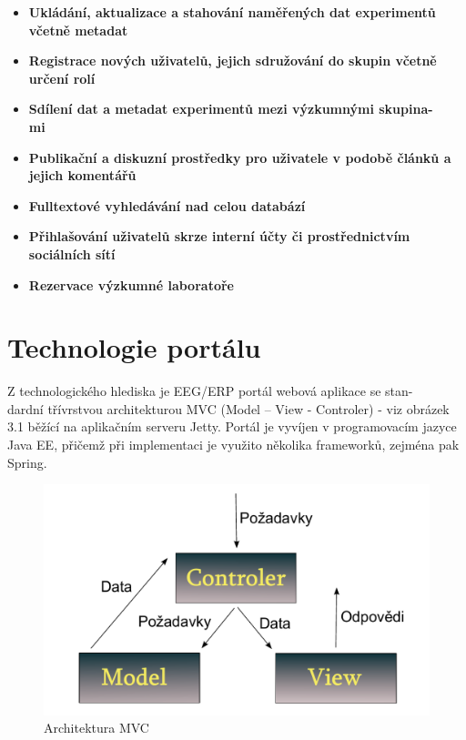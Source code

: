 \documentclass{projekt}
\begin{document}
\begin {itemize}

\item \textbf{Ukládání, aktualizace a stahování naměřených dat experimentů včetně metadat} 

\item \textbf{Registrace nových uživatelů, jejich sdružování do skupin včetně určení rolí} 
\item \textbf{Sdílení dat a metadat experimentů mezi výzkumnými skupina-\\mi}
\item \textbf{Publikační a diskuzní prostředky pro uživatele v podobě článků a jejich komentářů }
\item \textbf{Fulltextové vyhledávání nad celou databází}
\item \textbf{Přihlašování uživatelů skrze interní účty či prostřednictvím sociálních sítí}
\item \textbf{Rezervace výzkumné laboratoře}

\end {itemize}

\section{Technologie portálu}
\hspace{0.65cm}Z technologického hlediska je EEG/ERP portál webová aplikace se stan-\\dardní třívrstvou architekturou MVC (Model – View - Controler) - viz obrázek 3.1 běžící na aplikačním serveru Jetty. Portál je vyvíjen v programovacím jazyce Java EE, přičemž při implementaci je využito několika frameworků, zejména pak Spring.

\begin{figure}[htb]
\begin{center}
\includegraphics[scale=0.6]{mvc.pdf}
\caption{Architektura MVC}
\end{center}
\end{figure}
\end{document}

